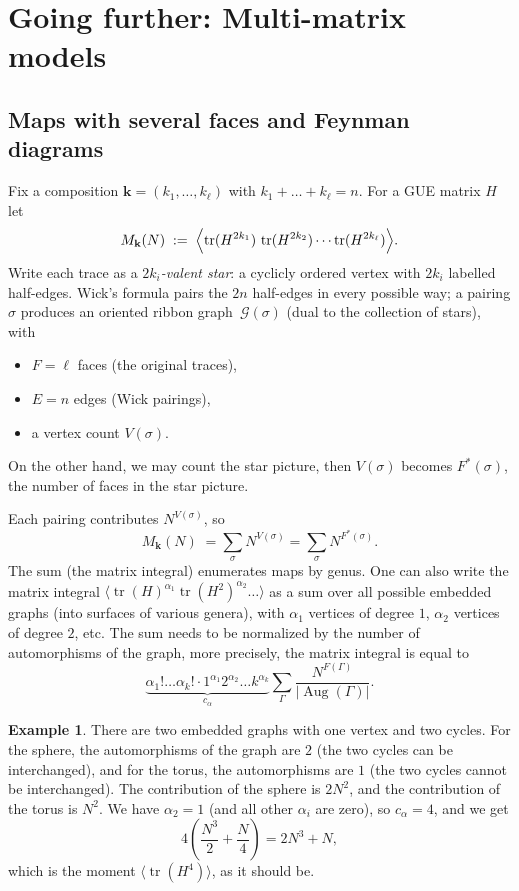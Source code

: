 \documentclass[letterpaper,11pt,oneside,reqno]{book}
\numberwithin{equation}{chapter}  %
\theoremstyle{definition}
\newtheorem{example}[proposition]{Example}
\begin{document}
\section{Going further: Multi-matrix models}

\subsection{Maps with several faces and Feynman diagrams}
\label{lecture15:subsec:feynman-multifaces}

Fix a composition $\mathbf k=(k_1,\dots,k_\ell)$ with
$k_1+\dots+k_\ell=n$.
For a GUE matrix $H$ let
\[
  M_{\mathbf k}(N)
  \;:=\;
  \Bigl\langle
    \operatorname{tr}(H^{2k_1})\,
    \operatorname{tr}(H^{2k_2})\cdots
    \operatorname{tr}(H^{2k_\ell})
  \Bigr\rangle .
\]
Write each trace as a \emph{$2k_i$-valent star}: a cyclicly ordered vertex
with $2k_i$ labelled half-edges.
Wick’s formula pairs the $2n$ half-edges in every possible way; a
pairing $\sigma$ produces an oriented ribbon graph~$\mathcal G(\sigma)$
(dual to the collection of stars),
with
\begin{itemize}
  \item $F=\ell$ faces (the original traces),
  \item $E=n$ edges (Wick pairings),
	\item a vertex count $V(\sigma)$.
\end{itemize}
On the other hand, we may count the star picture, then $V(\sigma)$ becomes
$F^*(\sigma)$, the number of faces in the star picture.

Each pairing contributes $N^{V(\sigma)}$, so
\[
  M_{\mathbf k}(N)\;=\sum_{\sigma} N^{V(\sigma)}=
	\sum_{\sigma} N^{F^*(\sigma)}.
\]
The sum (the matrix integral)
enumerates maps by genus.
One can also write the matrix integral
$\langle \operatorname{tr}(H)^{\alpha_1}\operatorname{tr}(H^2)^{\alpha_2}\ldots  \rangle $
as a sum over
all possible embedded graphs (into surfaces of various genera),
with $\alpha_1$ vertices of degree $1$,
$\alpha_2$ vertices of degree $2$, etc.
The sum needs to be normalized by the number of automorphisms of the graph,
more precisely, the matrix integral is equal to
\begin{equation*}
	\underbrace{\alpha_1!\ldots \alpha_k! \cdot 1^{\alpha_1}2^{\alpha_2}\ldots k^{\alpha_k}}_{c_\alpha}
	\sum_{\Gamma}\frac{N^{F(\Gamma)}}{|\operatorname{Aug}(\Gamma)|}.
\end{equation*}
\begin{example}
	There are two embedded graphs with one vertex and two cycles. For the sphere, the
	automorphisms of the graph are $2$ (the two cycles can be interchanged), and for the torus, the automorphisms are $1$ (the two cycles cannot be interchanged). The contribution of the sphere is $2N^2$, and the contribution of the torus is $N^2$.
	We have $\alpha_2=1$ (and all other $\alpha_i$ are zero), so
	$c_\alpha=4$, and we get
	\[
	4\left(\frac{N^3}{2} + \frac{N}{4}\right) = 2N^3 + N,
	\]
	which is the moment $\langle \operatorname{tr}\left( H^4 \right) \rangle $,
	as it should be.
\end{example}
\end{document}

